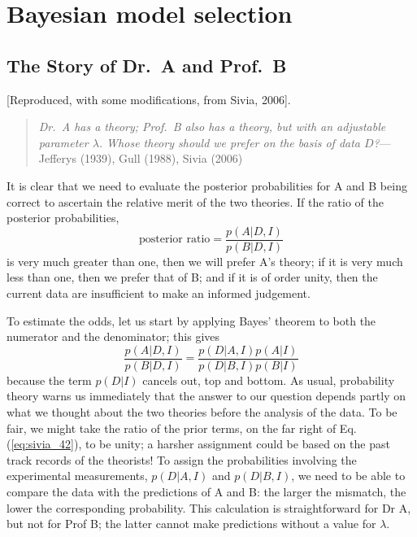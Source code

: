 \documentclass[%
oneside,                 %
final,                   %
10pt]{article}
\begin{document}
\noindent
\section{Bayesian model selection}
\subsection{The Story of Dr.~A and Prof.~B}
[Reproduced, with some modifications, from Sivia, 2006].

\begin{quote}
\emph{Dr.~A has a theory; Prof.~B also has a theory, but with an adjustable parameter $\lambda$. Whose theory should we prefer on the basis of data $D$?}--- Jefferys (1939), Gull (1988), Sivia (2006)
\end{quote}

It is clear that we need to evaluate the posterior probabilities for A and B being correct to ascertain the relative merit of the two theories. If the ratio of the posterior probabilities,
\begin{equation}
\text{posterior ratio} = \frac{p(A |D, I )}{p(B|D,I)}
\label{eq:sivia_41}
\end{equation}
is very much greater than one, then we will prefer A’s theory; if it is very much less than one, then we prefer that of B; and if it is of order unity, then the current data are insufficient to make an informed judgement.

To estimate the odds, let us start by applying Bayes’ theorem to both the numerator and the denominator; this gives
\begin{equation}
\frac{p(A|D,I)}{p(B|D,I)} = \frac{p(D|A,I) p(A|I)}{p(D|B,I) p(B|I)}
\label{eq:sivia_42}
\end{equation}
because the term $p(D|I)$ cancels out, top and bottom. As usual, probability theory warns us immediately that the answer to our question depends partly on what we thought about the two theories before the analysis of the data. To be fair, we might take the ratio of the prior terms, on the far right of Eq. (\ref{eq:sivia_42}), to be unity; a harsher assignment could be based on the past track records of the theorists! To assign the probabilities involving the experimental measurements, $p(D|A,I)$ and $p(D|B,I)$, we need to be able to compare the data with the predictions of A and B: the larger the mismatch, the lower the corresponding probability. This calculation is straightforward for Dr A, but not for Prof B; the latter cannot make predictions without a value for $\lambda$.
\end{document}
